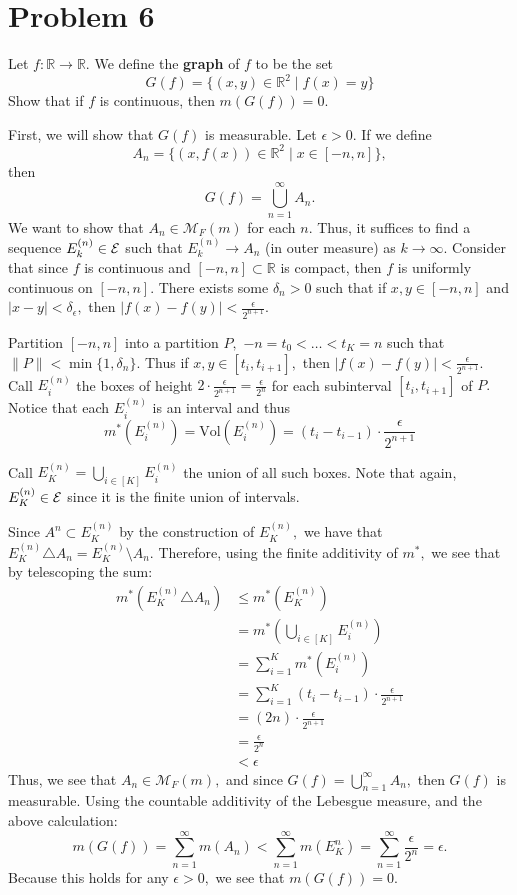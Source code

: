 \documentclass[11pt]{article}
\newcommand{\Vol}{\text{Vol}}
\newcommand{\bbR}{\mathbb{R}}
\newcommand{\sm}{\setminus}
\begin{document}
\section*{Problem 6}
\begin{problem}
    Let $f: \bbR \to \bbR.$ We define the \textbf{graph} of $f$ to be the set 
    \[G(f)= \{(x,y) \in \bbR^2 \mid f(x) = y\}\] Show that if $f$ is continuous, then $m\left(G(f)\right) = 0.$
\end{problem}
\begin{solution}
    First, we will show that $G(f)$ is measurable. Let $\epsilon>0.$ If we define 
    \[A_n = \{(x, f(x))\in \bbR^2 \mid x \in [-n, n]\},\] then 
    \[G(f) = \bigcup_{n=1}^\infty A_n.\] We want to show that $A_n \in \mathcal{M}_F(m)$ for each $n.$ Thus, it suffices to find a sequence $E^{(n)}_k \in \cal E$ such that $E^{(n)}_k \to A_n$ (in outer measure) as $k\to \infty.$ 
    Consider that since $f$ is continuous and $[-n, n]\subset \bbR$ is compact, then $f$ is uniformly continuous on $[-n,n].$  There exists some $\delta_n >0$ such that if $x,y \in [-n, n]$ and $|x-y| < \delta_\epsilon,$ then $|f(x) - f(y)|< \frac{\epsilon}{2^{{n+1}}}.$ 
    
    
    Partition $[-n, n]$ into a partition $P,$ $-n = t_0< \dots< t_K = n$ such that $\|P\| < \min\{1, \delta_n\}.$ Thus if $x,y \in [t_i, t_{i+1}],$ then $|f(x) - f(y)|< \frac{\epsilon}{2^{n+1}}.$ Call $E^{(n)}_i$ the boxes of height $2 \cdot \frac{\epsilon}{2^{n+1}} = \frac{\epsilon}{2^n}$ for each subinterval $[t_i, t_{i+1}]$ of $P.$ Notice that each $E_{i}^{(n)}$ is an interval and thus 
    \[m^*(E_{i}^{(n)}) = \Vol(E_{i}^{(n)}) = (t_{i} - t_{i-1}) \cdot \frac{\epsilon}{2^{n+1}}\]
    
    Call $E^{(n)}_K = \bigcup_{i \in [K]} E_i^{(n)}$ the union of all such boxes. Note that again, $E^{(n)}_K \in \cal E$ since it is the finite union of intervals.
    
    Since $A^n \subset E_K^{(n)}$ by the construction of $E_K^{(n)},$ we have that $E_K^{(n)} \triangle A_n = E_K^{(n)}\sm A_n.$ Therefore, using the finite additivity of $m^*,$ we see that by telescoping the sum:
    \begin{align*}
      m^*(E_K^{(n)} \triangle A_n) &\leq m^*(E_K^{(n)})\\ 
      &= m^*\left(\bigcup_{i\in [K]} E_i^{(n)}\right)\\
      &= \sum_{i =1}^{K}m^*(E_i^{(n)})\\
      &= \sum_{i=1}^K (t_{i} - t_{i-1}) \cdot \frac{\epsilon}{2^{n+1}}\\ 
      &= (2n)\cdot \frac{\epsilon}{2^{n+1}}\\
      &= \frac{\epsilon}{2^n}\\
      &< \epsilon
    \end{align*}
    Thus, we see that $A_n \in \mathcal{M}_F(m),$ and since $G(f) = \bigcup_{n=1}^\infty A_n,$ then $G(f)$ is measurable. Using the countable additivity of the Lebesgue measure, and the above calculation:
    \[m(G(f)) = \sum_{n=1}^\infty m(A_n) < \sum_{n=1}^\infty m(E_K^n) =\sum_{n=1}^\infty \frac{\epsilon}{2^n} = \epsilon.\] Because this holds for any $\epsilon>0,$ we see that $m(G(f)) = 0.$
\end{solution}
\end{document}
